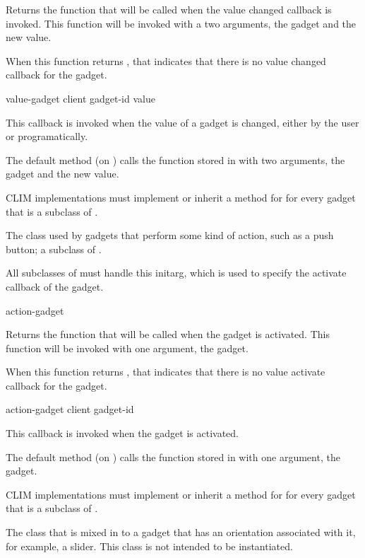 Returns the function that will be called when the value changed callback is
invoked.  This function will be invoked with a two arguments, the gadget and
the new value.

When this function returns , that indicates that there is no value
changed callback for the gadget.

 {value-gadget client gadget-id value}

This callback is invoked when the value of a gadget is changed, either by the
user or programatically.

The default method (on ) calls the function stored in
 with two arguments, the gadget and the new
value.

CLIM implementations must implement or inherit a method for
 for every gadget that is a subclass of
.



The class used by gadgets that perform some kind of action, such as a push
button; a subclass of .
\AbstractClass


All subclasses of  must handle this initarg, which is used to
specify the activate callback of the gadget.

 {action-gadget}

Returns the function that will be called when the gadget is activated.  This
function will be invoked with one argument, the gadget.

When this function returns , that indicates that there is no value
activate callback for the gadget.

 {action-gadget client gadget-id}

This callback is invoked when the gadget is activated.

The default method (on ) calls the function stored in
 with one argument, the gadget.

CLIM implementations must implement or inherit a method for
 for every gadget that is a subclass of
.



The class that is mixed in to a gadget that has an orientation associated with
it, for example, a slider.  This class is not intended to be instantiated.

